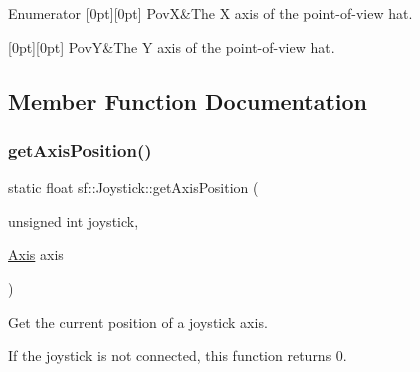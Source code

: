 \begin{DoxyEnumFields}{Enumerator}
[0pt][0pt]{}\mbox{\label{classsf_1_1_joystick_a48db337092c2e263774f94de6d50baa7a06420f7714e4dfd8b841885a0b5f3954}} 
PovX&The X axis of the point-\/of-\/view hat. \\
\hline

[0pt][0pt]{}\mbox{\label{classsf_1_1_joystick_a48db337092c2e263774f94de6d50baa7a0f8ffb2dcddf91b98ab910a4f8327ad9}} 
PovY&The Y axis of the point-\/of-\/view hat. \\
\hline

\end{DoxyEnumFields}


\subsection{Member Function Documentation}
\mbox{\label{classsf_1_1_joystick_aea4930193331df1851b709f3060ba58b}} 
\subsubsection{\texorpdfstring{get\+Axis\+Position()}{getAxisPosition()}}
{\footnotesize\ttfamily static float sf\+::\+Joystick\+::get\+Axis\+Position (\begin{DoxyParamCaption}\item[{unsigned int}]{joystick,  }\item[{\hyperlink{classsf_1_1_joystick_a48db337092c2e263774f94de6d50baa7}{Axis}}]{axis }\end{DoxyParamCaption})\hspace{0.3cm}{\ttfamily [static]}}



Get the current position of a joystick axis. 

If the joystick is not connected, this function returns 0.


